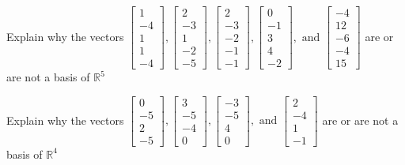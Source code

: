 \documentclass{article}
\begin{document}
\begin{exerciseStatement}
    Explain why the vectors \(\left[\begin{array}{r}
1 \\
-4 \\
1 \\
1 \\
-4
\end{array}\right] , \left[\begin{array}{r}
2 \\
-3 \\
1 \\
-2 \\
-5
\end{array}\right] , \left[\begin{array}{r}
2 \\
-3 \\
-2 \\
-1 \\
-1
\end{array}\right] , \left[\begin{array}{r}
0 \\
-1 \\
3 \\
4 \\
-2
\end{array}\right] , \text{ and } \left[\begin{array}{r}
-4 \\
12 \\
-6 \\
-4 \\
15
\end{array}\right]\) are or are not a basis of \(\mathbb{R}^5\)


  
\end{exerciseStatement}

\begin{exerciseStatement}
    Explain why the vectors \(\left[\begin{array}{r}
0 \\
-5 \\
2 \\
-5
\end{array}\right] , \left[\begin{array}{r}
3 \\
-5 \\
-4 \\
0
\end{array}\right] , \left[\begin{array}{r}
-3 \\
-5 \\
4 \\
0
\end{array}\right] , \text{ and } \left[\begin{array}{r}
2 \\
-4 \\
1 \\
-1
\end{array}\right]\) are or are not a basis of \(\mathbb{R}^4\)


  
\end{exerciseStatement}
\end{document}
